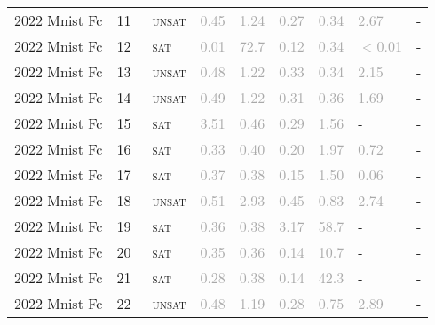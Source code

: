 \begin{center}
{\begin{longtable}{@{}lllllllll@{}}
2022 Mnist Fc & 11 & ~\textsc{unsat} & \textcolor{darkgray}{0.45} & \textcolor{darkgray}{1.24} & \textcolor{darkgray}{0.27} & \textcolor{darkgray}{0.34} & \textcolor{darkgray}{2.67} & - \\
2022 Mnist Fc & 12 & ~\textsc{sat} & \textcolor{darkgray}{0.01} & \textcolor{darkgray}{72.7} & \textcolor{darkgray}{0.12} & \textcolor{darkgray}{0.34} & \textcolor{darkgray}{$<$0.01} & - \\
2022 Mnist Fc & 13 & ~\textsc{unsat} & \textcolor{darkgray}{0.48} & \textcolor{darkgray}{1.22} & \textcolor{darkgray}{0.33} & \textcolor{darkgray}{0.34} & \textcolor{darkgray}{2.15} & - \\
2022 Mnist Fc & 14 & ~\textsc{unsat} & \textcolor{darkgray}{0.49} & \textcolor{darkgray}{1.22} & \textcolor{darkgray}{0.31} & \textcolor{darkgray}{0.36} & \textcolor{darkgray}{1.69} & - \\
2022 Mnist Fc & 15 & ~\textsc{sat} & \textcolor{darkgray}{3.51} & \textcolor{darkgray}{0.46} & \textcolor{darkgray}{0.29} & \textcolor{darkgray}{1.56} & - & - \\
2022 Mnist Fc & 16 & ~\textsc{sat} & \textcolor{darkgray}{0.33} & \textcolor{darkgray}{0.40} & \textcolor{darkgray}{0.20} & \textcolor{darkgray}{1.97} & \textcolor{darkgray}{0.72} & - \\
2022 Mnist Fc & 17 & ~\textsc{sat} & \textcolor{darkgray}{0.37} & \textcolor{darkgray}{0.38} & \textcolor{darkgray}{0.15} & \textcolor{darkgray}{1.50} & \textcolor{darkgray}{0.06} & - \\
2022 Mnist Fc & 18 & ~\textsc{unsat} & \textcolor{darkgray}{0.51} & \textcolor{darkgray}{2.93} & \textcolor{darkgray}{0.45} & \textcolor{darkgray}{0.83} & \textcolor{darkgray}{2.74} & - \\
2022 Mnist Fc & 19 & ~\textsc{sat} & \textcolor{darkgray}{0.36} & \textcolor{darkgray}{0.38} & \textcolor{darkgray}{3.17} & \textcolor{darkgray}{58.7} & - & - \\
2022 Mnist Fc & 20 & ~\textsc{sat} & \textcolor{darkgray}{0.35} & \textcolor{darkgray}{0.36} & \textcolor{darkgray}{0.14} & \textcolor{darkgray}{10.7} & - & - \\
2022 Mnist Fc & 21 & ~\textsc{sat} & \textcolor{darkgray}{0.28} & \textcolor{darkgray}{0.38} & \textcolor{darkgray}{0.14} & \textcolor{darkgray}{42.3} & - & - \\
2022 Mnist Fc & 22 & ~\textsc{unsat} & \textcolor{darkgray}{0.48} & \textcolor{darkgray}{1.19} & \textcolor{darkgray}{0.28} & \textcolor{darkgray}{0.75} & \textcolor{darkgray}{2.89} & - \\

\end{longtable}}
\end{center}
